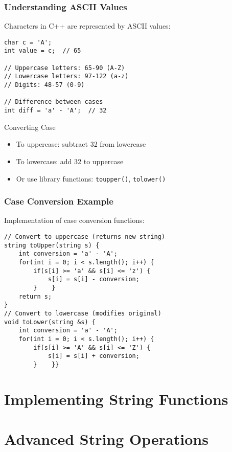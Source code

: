 \documentclass{beamer}
\begin{document}
\begin{frame}[fragile]
    \frametitle{Understanding ASCII Values}
    
    Characters in C++ are represented by ASCII values:
    

        \begin{lstlisting}
char c = 'A';
int value = c;  // 65

// Uppercase letters: 65-90 (A-Z)
// Lowercase letters: 97-122 (a-z)
// Digits: 48-57 (0-9)

// Difference between cases
int diff = 'a' - 'A';  // 32
        \end{lstlisting}
  
    
    \begin{block}{Converting Case}
        \begin{itemize}
            \item To uppercase: subtract 32 from lowercase
            \item To lowercase: add 32 to uppercase
            \item Or use library functions: \texttt{toupper()}, \texttt{tolower()}
        \end{itemize}
    \end{block}
\end{frame}

\begin{frame}[fragile]
    \frametitle{Case Conversion Example}
    
    Implementation of case conversion functions:
    
    \begin{lstlisting}
// Convert to uppercase (returns new string)
string toUpper(string s) {
    int conversion = 'a' - 'A';
    for(int i = 0; i < s.length(); i++) {
        if(s[i] >= 'a' && s[i] <= 'z') {
            s[i] = s[i] - conversion;
        }    }
    return s;
}
// Convert to lowercase (modifies original)
void toLower(string &s) {
    int conversion = 'a' - 'A';
    for(int i = 0; i < s.length(); i++) {
        if(s[i] >= 'A' && s[i] <= 'Z') {
            s[i] = s[i] + conversion;
        }    }}
    \end{lstlisting}
\end{frame}

\section{Implementing String Functions}


\section{Advanced String Operations}
\end{document}
